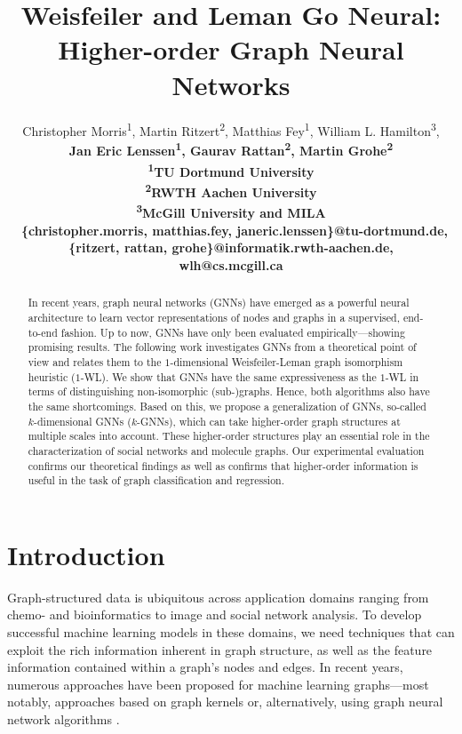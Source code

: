 \documentclass[letterpaper]{article}
\theoremstyle{definition}
\begin{document}
\title{Weisfeiler and Leman Go Neural: Higher-order Graph Neural Networks}
\author{
	Christopher Morris\textsuperscript{1},
	Martin Ritzert\textsuperscript{2},
	Matthias Fey\textsuperscript{1},
	William L. Hamilton\textsuperscript{3},\\\bf \Large
	Jan Eric Lenssen\textsuperscript{1},
	Gaurav Rattan\textsuperscript{2},
	Martin Grohe\textsuperscript{2}\\
	\textsuperscript{1}{TU Dortmund University}\\
	\textsuperscript{2}{RWTH Aachen University}\\
	\textsuperscript{3}{McGill University and MILA}\\\
	\{christopher.morris, matthias.fey, janeric.lenssen\}@tu-dortmund.de,\\
	\{ritzert, rattan, grohe\}@informatik.rwth-aachen.de,\\
	wlh@cs.mcgill.ca
}

\maketitle 

\begin{abstract}
	In recent years, graph neural networks (GNNs) have emerged as a powerful neural architecture to learn vector representations of nodes and graphs in a supervised, end-to-end fashion. Up to now, GNNs have only been evaluated empirically---showing promising results. The following work investigates GNNs from a theoretical point of view and relates them to the $1$-dimensional Weisfeiler-Leman graph isomorphism heuristic ($1$-WL). We show that GNNs have the same expressiveness as the $1$-WL in terms of distinguishing non-isomorphic (sub-)graphs. Hence, both algorithms also have the same shortcomings. Based on this, we propose a generalization of GNNs, so-called $k$-dimensional GNNs ($k$-GNNs), which can take higher-order graph structures at multiple scales into account. These higher-order structures play an essential role in the characterization of social networks and molecule graphs. Our experimental evaluation confirms our theoretical findings as well as confirms that higher-order information is useful in the task of graph classification and regression.
\end{abstract}



\section{Introduction}
Graph-structured data is ubiquitous across application domains ranging from chemo- and bioinformatics to image and social network analysis.
To develop successful machine learning models in these domains, we need techniques that can exploit the rich information inherent in graph structure, as well as the feature information contained within a graph's nodes and edges. In recent years, numerous approaches have been proposed for machine learning graphs---most notably, approaches based on graph kernels \cite{Vis+2010} or, alternatively, using graph neural network algorithms \cite{Ham+2017a}.
\end{document}
